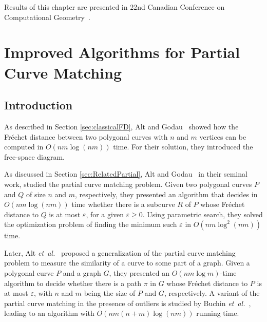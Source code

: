 \documentclass[12pt]{dalthesis}
\newcommand{\gee}{\geqslant}
\newcommand{\eps}{\varepsilon}
\newcommand{\etal}{{\em et~al.\/}}
\newcommand{\REM}[1]{}
\newcommand{\Frechet}{Fr\'echet }
\newcommand{\fs}{free-space }
\begin{document}
Results of this chapter 
are presented in 22nd Canadian Conference on Computational Geometry~\cite{oursCCCG2010}.
\clearpage{}



\clearpage{}\chapter{Improved Algorithms for Partial Curve Matching}
\label{ch:partial}

\section{Introduction} 
\label{sec:introduction}

\REM{
The \Frechet distance is a widely-used metric for measuring the similarity of the curves. 
It finds applications in morphing~\cite{EfratGHMM02},
handwriting recognition~\cite{SriraghavendraKB07}, protein structure alignment~\cite{JiangXZ08}, etc.
This measure is often illustrated as the minimum-length leash needed for a
person to walk a dog, while each of them is traversing
a pre-specified polygonal curve without backtracking.
}
As described in Section \ref{sec:classicalFD},
Alt and Godau~\cite{AltG95} showed how the 
\Frechet distance between two polygonal curves
with $n$ and $m$ vertices can be computed in $O(nm \log(nm))$ time.
For their solution, they introduced the \fs diagram.
\REM{
The \fs diagram and its variants have been proved to be useful in other applications
involving the \Frechet distance
(see e.g. \cite{AltERW03,BuchinBG10,WenkC10,HR11}).

Various extensions of the \Frechet distance have been studied in the literature,
including \Frechet distance between two curves 
inside a simple polygon~\cite{WenkC10}, on polyhedral surfaces~\cite{CookW09}, and on simplicial complexes~\cite{HR11}.

}

As discussed in Section
\ref{sec:RelatedPartial},
Alt and Godau~\cite{AltG95} 
in their seminal work, 
studied the partial curve matching problem.
Given two polygonal curves $P$ and $Q$ of size $n$ and $m$, respectively, 
they presented an algorithm that decides in $O(nm \log(nm))$ time whether
there is a subcurve $R$ of $P$ whose \Frechet distance to $Q$ is at most $\eps$,
for a given $\eps \gee 0$. 
Using parametric search, they solved the optimization problem of finding the minimum such $\eps$
in $O(nm \log^2(nm))$ time.

Later, Alt \etal~\cite{AltERW03a} proposed a generalization of the partial curve matching problem 
to measure the similarity of a curve to some part of a graph.
Given a polygonal curve $P$ and a graph $G$, 
they presented an $O(nm \log m)$-time algorithm to decide whether there is a path $\pi$ in $G$ whose 
\Frechet distance to $P$ is at most $\eps$, 
with $n$ and $m$ being the size of $P$ and $G$, respectively.
A variant of the partial curve matching
in the presence of outliers is studied by Buchin \etal~\cite{ExactPartial},
leading to an algorithm with $O(nm (n+m)\log(nm))$ running time.
\end{document}
